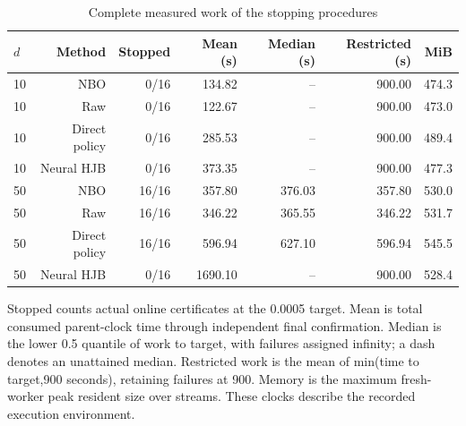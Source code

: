 \begin{table}[!htbp]
\centering\small
\caption{Complete measured work of the stopping procedures}
\label{tab:r15methodwork}
\begin{tabular}{lrrrrrr}
\toprule
$d$ & Method & Stopped & Mean (s) & Median (s) & Restricted (s) & MiB \\
\midrule
10 & NBO & 0/16 & 134.82 & -- & 900.00 & 474.3 \\
10 & Raw & 0/16 & 122.67 & -- & 900.00 & 473.0 \\
10 & Direct policy & 0/16 & 285.53 & -- & 900.00 & 489.4 \\
10 & Neural HJB & 0/16 & 373.35 & -- & 900.00 & 477.3 \\
50 & NBO & 16/16 & 357.80 & 376.03 & 357.80 & 530.0 \\
50 & Raw & 16/16 & 346.22 & 365.55 & 346.22 & 531.7 \\
50 & Direct policy & 16/16 & 596.94 & 627.10 & 596.94 & 545.5 \\
50 & Neural HJB & 0/16 & 1690.10 & -- & 900.00 & 528.4 \\
\bottomrule
\end{tabular}
\par\medskip\noindent\footnotesize Stopped counts actual online certificates at the 0.0005 target. Mean is total consumed parent-clock time through independent final confirmation. Median is the lower 0.5 quantile of work to target, with failures assigned infinity; a dash denotes an unattained median. Restricted work is the mean of min(time to target,900 seconds), retaining failures at 900. Memory is the maximum fresh-worker peak resident size over streams. These clocks describe the recorded execution environment.
\end{table}
